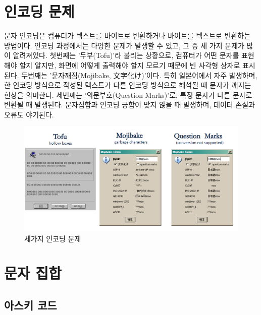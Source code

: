 \documentclass[
  letterpaper,
]{book}
\begin{document}
\hypertarget{uxc778uxcf54uxb529-uxbb38uxc81c}{%
\section{인코딩 문제}\label{uxc778uxcf54uxb529-uxbb38uxc81c}}

문자 인코딩은 컴퓨터가 텍스트를 바이트로 변환하거나 바이트를 텍스트로
변환하는 방법이다. 인코딩 과정에서는 다양한 문제가 발생할 수 있고, 그 중
세 가지 문제가 많이 알려져있다. 첫번째는 '두부(Tofu)'라 불리는 상황으로,
컴퓨터가 어떤 문자를 표현해야 할지 알지만, 화면에 어떻게 출력해야 할지
모르기 때문에 빈 사각형 상자로 표시된다. 두번째는 '문자깨짐(Mojibake,
文字化け)'이다. 특히 일본어에서 자주 발생하며, 한 인코딩 방식으로 작성된
텍스트가 다른 인코딩 방식으로 해석될 때 문자가 깨지는 현상을 의미한다.
세번째는 '의문부호(Question Marks)'로, 특정 문자가 다른 문자로 변환될 때
발생된다. 문자집합과 인코딩 궁합이 맞지 않을 때 발생하며, 데이터 손실과
오류도 야기된다.

\begin{figure}

{\centering \includegraphics{images/common-encoding-problem.png}

}

\caption{세가지 인코딩 문제}

\end{figure}

\hypertarget{uxbb38uxc790-uxc9d1uxd569}{%
\section{문자 집합}\label{uxbb38uxc790-uxc9d1uxd569}}

\hypertarget{uxc544uxc2a4uxd0a4-uxcf54uxb4dc}{%
\subsection{아스키 코드}\label{uxc544uxc2a4uxd0a4-uxcf54uxb4dc}}
\end{document}
